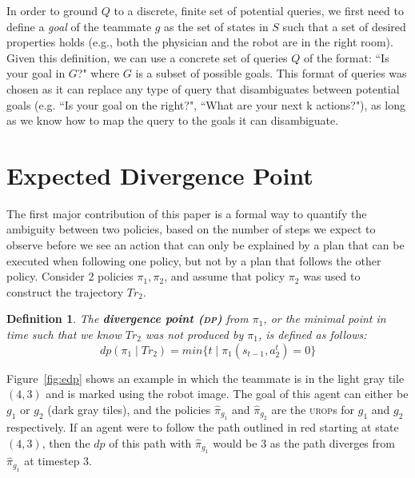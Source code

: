 \documentclass[letterpaper]{article}
\newtheorem{definition}{Definition}
\begin{document}
In order to ground $Q$ to a discrete, finite set of potential queries, we first need to define a \emph{goal} of the teammate $g$ as the set of states in $S$ such that a set of desired properties holds (e.g., both the physician and the robot are in the right room). Given this definition, we can use a concrete set of queries $Q$ of the format: ``Is your goal in $G$?" where $G$ is a subset of possible goals. This format of queries was chosen as it can replace any type of query that disambiguates between potential goals (e.g. ``Is your goal on the right?", ``What are your next k actions?"), as long as we know how to map the query to the goals it can disambiguate.


\section{Expected Divergence Point}
The first major contribution of this paper is a formal way to quantify the ambiguity between two policies, based on the number of steps we expect to observe before we see an action that can only be explained by a plan that can be executed when following one policy, but not by a plan that follows the other policy. Consider 2 policies $\pi_1,\pi_2$, %
and assume that policy $\pi_2$ was used to construct the trajectory $Tr_2$.  %
\begin{definition}
The \textbf{divergence point (\textsc{dp})} from $\pi_1$, or the minimal point in time such that we know $Tr_2$ was not produced by $\pi_1$, is defined as follows:
\begin{equation*}
dp(\pi_1 \mid Tr_2) = min\{t \mid \pi_1(s_{t-1}, a_2^t) = 0\}
\end{equation*}
\end{definition}

Figure~\ref{fig:edp} shows an example in which the teammate is in the light gray tile $(4,3)$ and is marked using the robot image. The goal of this agent can either be $g_1$ or $g_2$ (dark gray tiles), and the policies $\hat{\pi}_{g_1}$ and $\hat{\pi}_{g_2}$ are the \textsc{urop}s for  $g_1$ and $g_2$ respectively.
If an agent were to follow the path outlined in red starting at state $(4,3)$, then the $dp$ of this path with $\hat{\pi}_{g_1}$ would be 3 as the path diverges from $\hat{\pi}_{g_1}$ at timestep 3.
\end{document}
